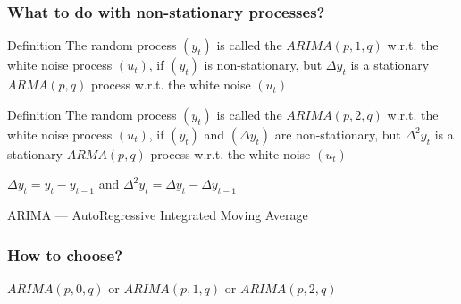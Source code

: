\begin{frame}
	\frametitle{What to do with non-stationary processes?}
	
	\begin{block}{Definition}
		The random process $(y_t)$ is called the $ARIMA(p, 1, q)$ w.r.t. the white noise process $(u_t)$,
		if $(y_t)$ is non-stationary, but $\Delta y_t$ is a stationary $ARMA(p, q)$ process w.r.t. the  white noise $(u_t)$
	\end{block}
	
	\pause
	
	\begin{block}{Definition}
		The random process $(y_t)$ is called the $ARIMA(p, 2, q)$ w.r.t. the  white noise process $(u_t)$,
		if $(y_t)$ and $(\Delta y_t)$ are non-stationary, but $\Delta^2 y_t$ is a stationary $ARMA(p, q)$ process w.r.t. the white noise $(u_t)$
	\end{block}
	
	\pause
	$\Delta y_t = y_t - y_{t-1}$ and $\Delta^2 y_t = \Delta y_t - \Delta y_{t-1}$
	
	\pause
	ARIMA — \alert{A}uto\alert{R}egressive \alert{I}ntegrated \alert{M}oving \alert{A}verage
	
\end{frame}

\begin{frame}
	\frametitle{How to choose?}
	
	$ARIMA(p, 0, q)$ or $ARIMA(p, 1, q)$ or $ARIMA(p, 2, q)$
	\begin{itemize}
		
		
		
		
	\end{itemize}
	
\end{frame}

